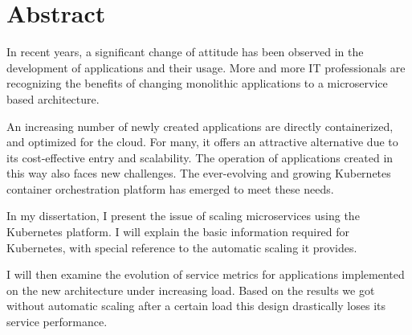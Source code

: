 


\vfill
\selectenglish

\chapter*{Abstract}

In recent years, a significant change of attitude has been observed in the development of applications and their usage. More and more IT professionals are recognizing the benefits of changing monolithic applications to a microservice based architecture.

An increasing number of newly created applications are directly containerized, and optimized for the cloud.
For many, it offers an attractive alternative due to its cost-effective entry and scalability.
The operation of applications created in this way also faces new challenges.
The ever-evolving and growing Kubernetes container orchestration platform has emerged to meet these needs.

In my dissertation, I present the issue of scaling microservices using the Kubernetes platform. 
I will explain the basic information required for Kubernetes, with special reference to the automatic scaling it provides.

I will then examine the evolution of service metrics for applications implemented on the new architecture under increasing load. 
Based on the results we got without automatic scaling after a certain load this design drastically loses its service performance.

